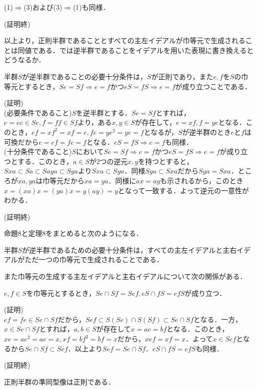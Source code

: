 (1)$\Rightarrow$(3)および(3)$\Rightarrow$(1)も同様．
\begin{flushright}
(証明終)
\end{flushright}
以上より，正則半群であることとすべての主左イデアルが巾等元で生成されることは同値である．では逆半群であることをイデアルを用いた表現に書き換えるとどうなるか．
\begin{sthm}
半群$S$が逆半群であることの必要十分条件は，$S$が正則であり，また$e,f$を$S$の巾等元とするとき，$Se=Sf\Rightarrow e=f$かつ$eS=fS\Rightarrow e=f$が成り立つことである．
\end{sthm}
(証明)\\
(必要条件であること)$S$を逆半群とする．$Se=Sf$とすれば，$e=ee\in Se, f=ff\in Sf$より，ある$x,y\in S$が存在して，$e=xf,f=ye$となる．このとき，$ef=xf^2=xf=e,fe=ye^2=ye=f$となるが，$S$が逆半群のとき$e$と$f$は可換だから$e=ef=fe=f$となる．$eS=fS\Rightarrow e=f$も同様．\\
(十分条件であること)$S$において$Se=Sf\Rightarrow e=f$かつ$eS=fS\Rightarrow e=f$が成り立つとする．このとき，$a\in S$が2つの逆元$x,y$を持つとすると，$Sxa\subset Sa\subset Saya\subset Sya$より$Sxa\subset Sya$．同様$Sya\subset Sxa$だから$Sya=Sxa$．ところが$xa,ya$は巾等元だから$xa=ya$．同様に$ax=ay$も示されるから，このとき$x=(xa)x=(ya)x=y(ay)=y$となって一致する．よって逆元の一意性がわかる．
\begin{flushright}
(証明終)
\end{flushright}
命題8と定理8をまとめると次のようになる．
\begin{sthm}
半群$S$が逆半群であるための必要十分条件は，すべての主左イデアルと主右イデアルがただ一つの巾等元で生成されることである．
\end{sthm}
また巾等元の生成する主左イデアルと主右イデアルについて次の関係がある．
\begin{sprop}
$e,f\in S$を巾等元とするとき，$Se\cap Sf=Sef, eS\cap fS=efS$が成り立つ．
\end{sprop}
(証明)\\
$ef=fe\in Se\cap Sf$だから，$Sef\subset S(Se)\cap S(Sf)\subset Se\cap Sf$となる．一方，$x\in Se \cap Sf$とすれば，$a,b\in S$が存在して$x=ae=bf$となる．このとき，$xe=ae^2=ae=x,xf=bf^2=bf=x$だから，$xef=xf=x$．よって$x\in Sef$となるから$Se\cap Sf\subset Sef$．以上より$Sef=Se\cap Sf$．$eS\cap fS=efS$も同様．
\begin{flushright}
(証明終)
\end{flushright}
\begin{sprop}
正則半群の準同型像は正則である．
\end{sprop}
